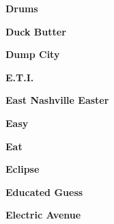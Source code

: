 \vspace{10pt} 
\begin{center}\textbf{Drums}\end{center}
\newline
\vspace{10pt} 
\begin{center}\textbf{Duck Butter}\end{center}
\newline
\vspace{10pt} 
\begin{center}\textbf{Dump City}\end{center}
\newline
\vspace{10pt} 
\begin{center}\textbf{E.T.I.}\end{center}
\newline
\vspace{10pt} 
\begin{center}\textbf{East Nashville Easter}\end{center}
\newline
\vspace{10pt} 
\begin{center}\textbf{Easy}\end{center}
\newline
\vspace{10pt} 
\begin{center}\textbf{Eat}\end{center}
\newline
\vspace{10pt} 
\begin{center}\textbf{Eclipse}\end{center}
\newline
\vspace{10pt} 
\begin{center}\textbf{Educated Guess}\end{center}
\newline
\vspace{10pt} 
\begin{center}\textbf{Electric Avenue}\end{center}
\newline
